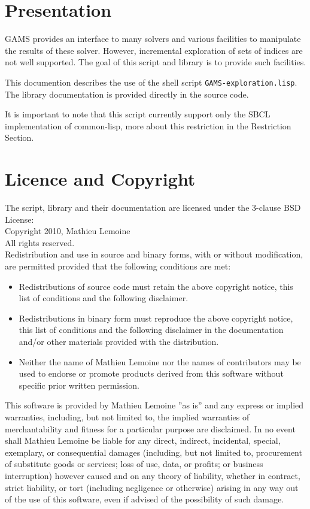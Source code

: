 \section*{Presentation}

GAMS provides an interface to many solvers and various facilities to manipulate
the results of these solver. However, incremental exploration of sets of indices
are not well supported. The goal of this script and library is to provide such
facilities.

This documention describes the use of the shell script
\texttt{GAMS-exploration.lisp}. The library documentation is provided directly
in the source code.

It is important to note that this script currently support only the SBCL
implementation of common-lisp, more about this restriction in the Restriction
Section.

\section*{Licence and Copyright}
The script, library and their documentation are licensed under the 3-clause BSD
License:\\
Copyright \textcopyright{} 2010, Mathieu Lemoine\\
All rights reserved.\\
% 
Redistribution and use in source and binary forms, with or without modification,
are permitted provided that the following conditions are met:
\begin{itemize}
\item Redistributions of source code must retain the above copyright notice,
  this list of conditions and the following disclaimer.
\item Redistributions in binary form must reproduce the above copyright notice,
  this list of conditions and the following disclaimer in the documentation
  and/or other materials provided with the distribution.
\item Neither the name of Mathieu Lemoine nor the names of contributors may be
  used to endorse or promote products derived from this software without
  specific prior written permission.
\end{itemize}
% 
This software is provided by Mathieu Lemoine ''as is'' and any express or
implied warranties, including, but not limited to, the implied warranties of
merchantability and fitness for a particular purpose are disclaimed. In no event
shall Mathieu Lemoine be liable for any direct, indirect, incidental, special,
exemplary, or consequential damages (including, but not limited to, procurement
of substitute goods or services; loss of use, data, or profits; or business
interruption) however caused and on any theory of liability, whether in
contract, strict liability, or tort (including negligence or otherwise) arising
in any way out of the use of this software, even if advised of the possibility
of such damage.

